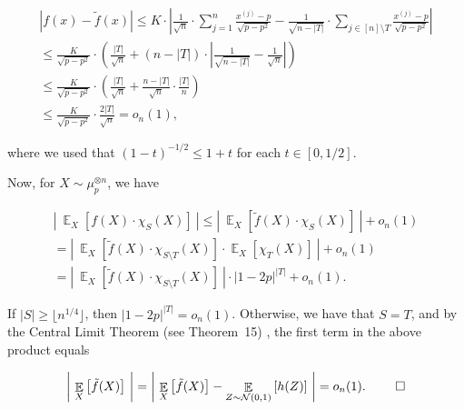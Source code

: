 \begin{itemize}
\[\begin{gathered}
\displaystyle\left|f(x)-\tilde{f}(x)\right| \displaystyle\leqslant K\cdot\left|\frac{1}{\sqrt{n}}\cdot\sum_{j=1}^{n}\frac{x^{\left(j\right)}-p}{\sqrt{p-p^{2}}}-\frac{1}{\sqrt{n-\left|T\right|}}\cdot\sum_{j\in[n]\setminus T}\frac{x^{\left(j\right)}-p}{\sqrt{p-p^{2}}}\right| \\
\displaystyle\leqslant\frac{K}{\sqrt{p-p^{2}}}\cdot\left(\frac{\left|T\right|}{\sqrt{n}}+\left(n-\left|T\right|\right)\cdot\left|\frac{1}{\sqrt{n-\left|T\right|}}-\frac{1}{\sqrt{n}}\right|\right) \\
\displaystyle\leqslant\frac{K}{\sqrt{p-p^{2}}}\cdot\left(\frac{\left|T\right|}{\sqrt{n}}+\frac{n-\left|T\right|}{\sqrt{n}}\cdot\frac{\left|T\right|}{n}\right) \\
\displaystyle\leqslant\frac{K}{\sqrt{p-p^{2}}}\cdot\frac{2\left|T\right|}{\sqrt{n}}=o_{n}(1),
\end{gathered}\]


where we used that $(1-t)^{-1/2}\leqslant 1+t$ for each $t\in[0,1/2]$.\par




Now, for $X\sim\mu_{p}^{\otimes n}$, we have\par


\[\begin{gathered}
\displaystyle\left|\ \mathop{\mathbb{E}}_{X}\left[f(X)\cdot\chi_{S}(X)\right]\ \right| \displaystyle\leqslant\left|\ \mathop{\mathbb{E}}_{X}\left[\tilde{f}(X)\cdot\chi_{S}(X)\right]\ \right|+o_{n}(1) \\
\displaystyle=\left|\ \mathop{\mathbb{E}}_{X}\left[\tilde{f}(X)\cdot\chi_{S\setminus T}(X)\right]\cdot\mathop{\mathbb{E}}_{X}\left[\chi_{T}(X)\right]\ \right|+o_{n}(1) \\
\displaystyle=\left|\ \mathop{\mathbb{E}}_{X}\left[\tilde{f}(X)\cdot\chi_{S\setminus T}(X)\right]\ \right|\cdot\left|1-2p\right|^{\left|T\right|}+o_{n}(1).
\end{gathered}\]


If $\left|S\right|\geqslant\lfloor n^{1/4}\rfloor$, then $\left|1-2p\right|^{\left|T\right|}=o_{n}(1)$.
Otherwise, we have that $S=T$, and by the Central Limit Theorem (see Theorem 15) , the first term in the above product equals\par


\[\begin{gathered}
\left|\ \mathop{\mathbb{E}}_{X}\left[\tilde{f}(X)\right]\ \right|=\left|\ \mathop{\mathbb{E}}_{X}\left[\tilde{f}(X)\right]-\mathop{\mathbb{E}}_{Z\sim\mathcal{N}(0,1)}\left[h(Z)\right]\ \right|=o_{n}(1).\ \qed
\end{gathered}\]





\end{itemize}





